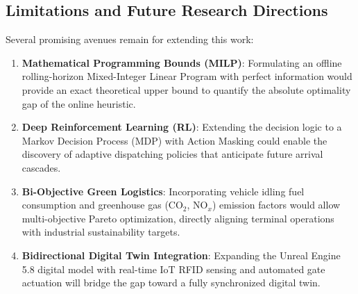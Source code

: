 \documentclass[12pt,a4paper]{article}
\begin{document}
\subsection{Limitations and Future Research Directions}
Several promising avenues remain for extending this work:
\begin{enumerate}[leftmargin=1.2cm,itemsep=0pt,topsep=2pt]
  \item \textbf{Mathematical Programming Bounds (MILP)}: Formulating an offline rolling-horizon Mixed-Integer Linear Program with perfect information would provide an exact theoretical upper bound to quantify the absolute optimality gap of the online heuristic.
  \item \textbf{Deep Reinforcement Learning (RL)}: Extending the decision logic to a Markov Decision Process (MDP) with Action Masking could enable the discovery of adaptive dispatching policies that anticipate future arrival cascades.
  \item \textbf{Bi-Objective Green Logistics}: Incorporating vehicle idling fuel consumption and greenhouse gas ($\text{CO}_2$, $\text{NO}_x$) emission factors would allow multi-objective Pareto optimization, directly aligning terminal operations with industrial sustainability targets.
  \item \textbf{Bidirectional Digital Twin Integration}: Expanding the Unreal Engine 5.8 digital model with real-time IoT RFID sensing and automated gate actuation will bridge the gap toward a fully synchronized digital twin.
\end{enumerate}

\printbibliography
\end{document}
